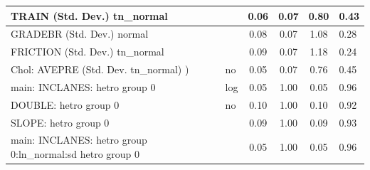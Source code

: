 \begin{table}
\begin{center}
\begin{tabular}{|l|l|c|c|c|l|}
			\hline
			TRAIN (Std. Dev.) tn_normal &  & 0.06 & 0.07 & 0.80 & 0.43 \\
			\hline
			GRADEBR (Std. Dev.) normal &  & 0.08 & 0.07 & 1.08 & 0.28 \\
			\hline
			FRICTION (Std. Dev.) tn_normal &  & 0.09 & 0.07 & 1.18 & 0.24 \\
			\hline
			 Chol: AVEPRE (Std. Dev. tn_normal) ) & no & 0.05 & 0.07 & 0.76 & 0.45 \\
			\hline
			main: INCLANES: hetro group 0 & log & 0.05 & 1.00 & 0.05 & 0.96 \\
			\hline
			DOUBLE: hetro group 0 & no & 0.10 & 1.00 & 0.10 & 0.92 \\
			\hline
			SLOPE: hetro group 0 &  & 0.09 & 1.00 & 0.09 & 0.93 \\
			\hline
			main: INCLANES: hetro group 0:ln_normal:sd  hetro group 0 &  & 0.05 & 1.00 & 0.05 & 0.96 \\
			\hline
		\end{tabular}
	\end{center}
\end{table}